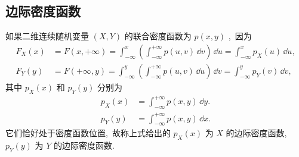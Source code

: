   \subsection{边际密度函数}\label{ssec:3.2.3}
  如果二维连续随机变量 $(X,Y)$ 的联合密度函数为 $p(x,y)$ ,\ 因为
  \begin{align*}
  F_{X}(x) &= F(x,+\infty)=\int_{-\infty}^{x}\left( \int_{-\infty}^{+\infty}p(u,v)\,\dd v \right)\,\dd u=\int_{-\infty}^{x}p_{X}(u)\,\dd u,\\
  F_{Y}(y) &= F(+\infty,y)=\int_{-\infty}^{y}\left( \int_{-\infty}^{+\infty}p(u,v)\,\dd u \right)\,\dd v=\int_{-\infty}^{y}p_{Y}(v)\,\dd v,
  \end{align*}
  其中 $p_{X}(x)$ 和 $p_{Y}(y)$ 分别为
  \begin{align}
  p_{X}(x) &= \int_{-\infty}^{+\infty}p(x,y)\,\dd y.\label{eq:3.2.5}\\
  p_{Y}(y) &= \int_{-\infty}^{+\infty}p(x,y)\,\dd x.\label{eq:3.2.6}
  \end{align}
  它们恰好处于密度函数位置,\ 故称上式给出的 $p_{X}(x)$ 为 $X$ 的边际密度函数,\ $p_{Y}(y)$ 为 $Y$ 的边际密度函数.
  
